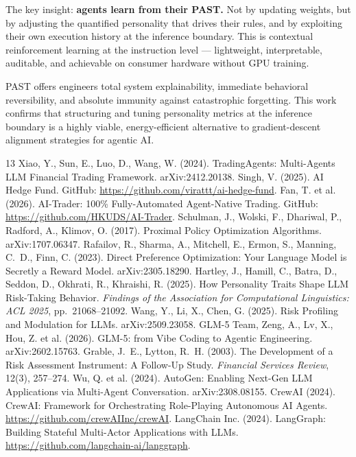 \documentclass[11pt]{article}
\begin{document}
The key insight: \textbf{agents learn from their PAST.} Not by updating weights, but by adjusting the quantified personality that drives their rules, and by exploiting their own execution history at the inference boundary. This is contextual reinforcement learning at the instruction level --- lightweight, interpretable, auditable, and achievable on consumer hardware without GPU training.

PAST offers engineers total system explainability, immediate behavioral reversibility, and absolute immunity against catastrophic forgetting. This work confirms that structuring and tuning personality metrics at the inference boundary is a highly viable, energy-efficient alternative to gradient-descent alignment strategies for agentic AI.

\begin{thebibliography}{13}
 Xiao, Y., Sun, E., Luo, D., Wang, W. (2024). TradingAgents: Multi-Agents LLM Financial Trading Framework. arXiv:2412.20138.
 Singh, V. (2025). AI Hedge Fund. GitHub: \url{https://github.com/virattt/ai-hedge-fund}.
 Fan, T. et al. (2026). AI-Trader: 100\% Fully-Automated Agent-Native Trading. GitHub: \url{https://github.com/HKUDS/AI-Trader}.
 Schulman, J., Wolski, F., Dhariwal, P., Radford, A., Klimov, O. (2017). Proximal Policy Optimization Algorithms. arXiv:1707.06347.
 Rafailov, R., Sharma, A., Mitchell, E., Ermon, S., Manning, C.~D., Finn, C. (2023). Direct Preference Optimization: Your Language Model is Secretly a Reward Model. arXiv:2305.18290.
 Hartley, J., Hamill, C., Batra, D., Seddon, D., Okhrati, R., Khraishi, R. (2025). How Personality Traits Shape LLM Risk-Taking Behavior. \emph{Findings of the Association for Computational Linguistics: ACL 2025}, pp.~21068--21092.
 Wang, Y., Li, X., Chen, G. (2025). Risk Profiling and Modulation for LLMs. arXiv:2509.23058.
 GLM-5 Team, Zeng, A., Lv, X., Hou, Z. et al. (2026). GLM-5: from Vibe Coding to Agentic Engineering. arXiv:2602.15763.
 Grable, J.~E., Lytton, R.~H. (2003). The Development of a Risk Assessment Instrument: A Follow-Up Study. \emph{Financial Services Review}, 12(3), 257--274.
 Wu, Q. et al. (2024). AutoGen: Enabling Next-Gen LLM Applications via Multi-Agent Conversation. arXiv:2308.08155.
 CrewAI (2024). CrewAI: Framework for Orchestrating Role-Playing Autonomous AI Agents. \url{https://github.com/crewAIInc/crewAI}.
 LangChain Inc. (2024). LangGraph: Building Stateful Multi-Actor Applications with LLMs. \url{https://github.com/langchain-ai/langgraph}.
\end{thebibliography}
\end{document}
